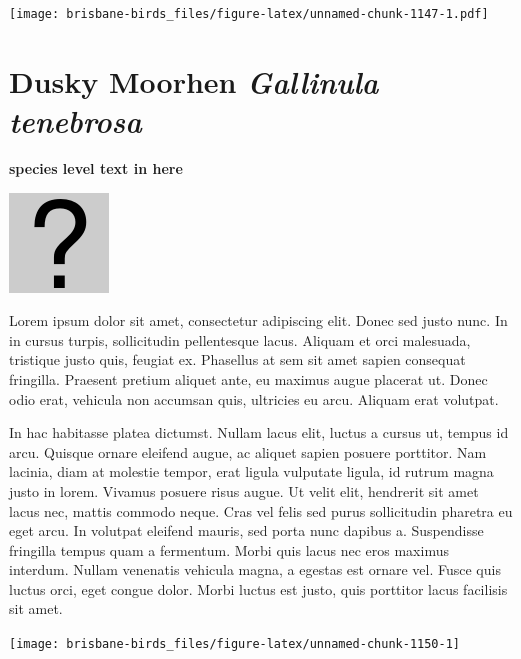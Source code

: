 \documentclass[]{book}
\let\origfigure\figure
\let\endorigfigure\endfigure
\renewenvironment{figure}[1][2] {
  \expandafter\origfigure\expandafter[H]
} {
  \endorigfigure
}
\begin{document}
\begin{figure}
\centering
\texttt{[image: brisbane-birds\_files/figure-latex/unnamed-chunk-1147-1.pdf]}
\caption{\label{fig:unnamed-chunk-1147}insert figure caption}
\end{figure}

\section{\texorpdfstring{Dusky Moorhen \emph{Gallinula
tenebrosa}}{Dusky Moorhen Gallinula tenebrosa}}\label{dusky-moorhen-gallinula-tenebrosa}

\textbf{species level text in here}

\begin{figure}
\centering
\includegraphics{assets/missing.png}
\caption{No image for species}
\end{figure}

Lorem ipsum dolor sit amet, consectetur adipiscing elit. Donec sed justo
nunc. In in cursus turpis, sollicitudin pellentesque lacus. Aliquam et
orci malesuada, tristique justo quis, feugiat ex. Phasellus at sem sit
amet sapien consequat fringilla. Praesent pretium aliquet ante, eu
maximus augue placerat ut. Donec odio erat, vehicula non accumsan quis,
ultricies eu arcu. Aliquam erat volutpat.

In hac habitasse platea dictumst. Nullam lacus elit, luctus a cursus ut,
tempus id arcu. Quisque ornare eleifend augue, ac aliquet sapien posuere
porttitor. Nam lacinia, diam at molestie tempor, erat ligula vulputate
ligula, id rutrum magna justo in lorem. Vivamus posuere risus augue. Ut
velit elit, hendrerit sit amet lacus nec, mattis commodo neque. Cras vel
felis sed purus sollicitudin pharetra eu eget arcu. In volutpat eleifend
mauris, sed porta nunc dapibus a. Suspendisse fringilla tempus quam a
fermentum. Morbi quis lacus nec eros maximus interdum. Nullam venenatis
vehicula magna, a egestas est ornare vel. Fusce quis luctus orci, eget
congue dolor. Morbi luctus est justo, quis porttitor lacus facilisis sit
amet.

\begin{figure}
\texttt{[image: brisbane-birds\_files/figure-latex/unnamed-chunk-1150-1]} \caption{insert figure caption}\label{fig:unnamed-chunk-1150}
\end{figure}
\end{document}
